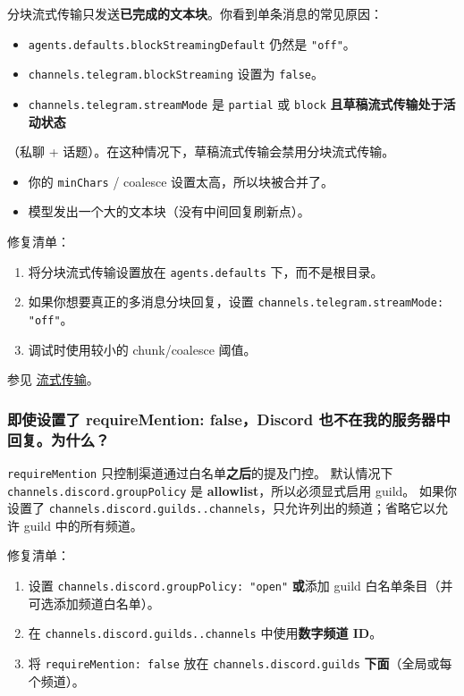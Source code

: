 分块流式传输只发送\textbf{已完成的文本块}。你看到单条消息的常见原因：

\begin{itemize}
  \item \texttt{agents.defaults.blockStreamingDefault} 仍然是 \texttt{"off"}。
  \item \texttt{channels.telegram.blockStreaming} 设置为 \texttt{false}。
  \item \texttt{channels.telegram.streamMode} 是 \texttt{partial} 或 \texttt{block} \textbf{且草稿流式传输处于活动状态}
\end{itemize}

（私聊 + 话题）。在这种情况下，草稿流式传输会禁用分块流式传输。
\begin{itemize}
  \item 你的 \texttt{minChars} / coalesce 设置太高，所以块被合并了。
  \item 模型发出一个大的文本块（没有中间回复刷新点）。
\end{itemize}


修复清单：

\begin{enumerate}
  \item 将分块流式传输设置放在 \texttt{agents.defaults} 下，而不是根目录。
  \item 如果你想要真正的多消息分块回复，设置 \texttt{channels.telegram.streamMode: "off"}。
  \item 调试时使用较小的 chunk/coalesce 阈值。
\end{enumerate}


参见 \href{/concepts/streaming}{流式传输}。

\subsubsection{即使设置了 requireMention: false，Discord 也不在我的服务器中回复。为什么？}


\texttt{requireMention} 只控制渠道通过白名单\textbf{之后}的提及门控。
默认情况下 \texttt{channels.discord.groupPolicy} 是 \textbf{allowlist}，所以必须显式启用 guild。
如果你设置了 \texttt{channels.discord.guilds..channels}，只允许列出的频道；省略它以允许 guild 中的所有频道。

修复清单：

\begin{enumerate}
  \item 设置 \texttt{channels.discord.groupPolicy: "open"} \textbf{或}添加 guild 白名单条目（并可选添加频道白名单）。
  \item 在 \texttt{channels.discord.guilds..channels} 中使用\textbf{数字频道 ID}。
  \item 将 \texttt{requireMention: false} 放在 \texttt{channels.discord.guilds} \textbf{下面}（全局或每个频道）。
\end{enumerate}

